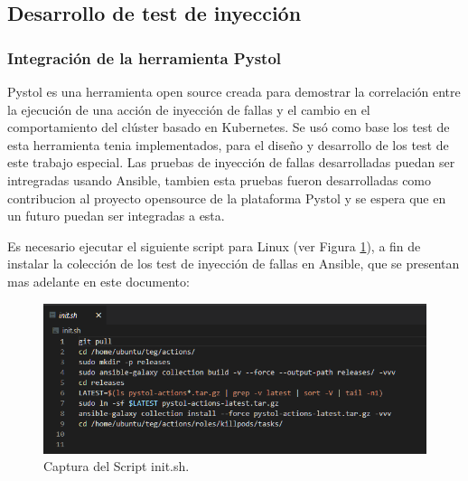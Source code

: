 \subsection{Desarrollo de test de inyección}

\subsubsection{Integraci\'on de la herramienta Pystol}
\par Pystol es una herramienta open source creada para demostrar la correlación entre la ejecución de una acción de inyección de fallas y el cambio en el comportamiento del clúster basado en Kubernetes. Se us\'o como base los test de esta herramienta tenia implementados, para el diseño y desarrollo de los test de este trabajo especial. Las pruebas de inyecci\'on de fallas desarrolladas puedan ser intregradas usando Ansible, tambien esta pruebas fueron desarrolladas como contribucion al proyecto opensource de la plataforma Pystol y se espera que en un futuro puedan ser integradas a esta.\\

\par Es necesario ejecutar el siguiente script para Linux (ver Figura \ref{fig:initsh}), a fin de instalar la colecci\'on de los test de inyecci\'on de fallas en Ansible, que se presentan mas adelante en este documento:

\begin{figure}[htpb!]
	\centering
	\includegraphics[width=0.95\columnwidth]{images/captures/initsh.PNG}
	\caption{Captura del Script init.sh.}
	\label{fig:initsh}
\end{figure}

 
 
